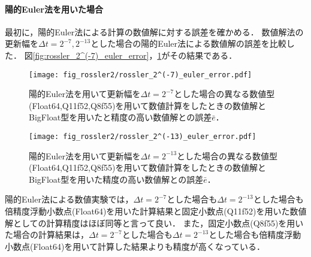 \paragraph*{陽的Euler法を用いた場合}
最初に，陽的Euler法による計算の数値解に対する誤差を確かめる．
数値解法の更新幅を$\Delta t = 2^{-7},2^{-13}$とした場合の陽的Euler法による数値解の誤差を比較した．
図\ref{fig:rossler_2^(-7)_euler_error}，\ref{fig:rossler_2^(-13)_euler_error}がその結果である．
\begin{figure}[H]
    \centering
    \begin{minipage}[b]{0.48\columnwidth}
        \centering
        \texttt{[image: fig\_rossler2/rossler\_2^(-7)\_euler\_error.pdf]}
        \caption{陽的Euler法を用いて更新幅を$\Delta t = 2^{-7}$とした場合の異なる数値型(Float64,Q11f52,Q8f55)を用いて数値計算をしたときの数値解とBigFloat型を用いたと精度の高い数値解との誤差$\bar{e}$．}
        \label{fig:rossler_2^(-7)_euler_error}
    \end{minipage}
    \hspace{0.01\columnwidth}
    \begin{minipage}[b]{0.48\columnwidth}
        \centering
        \texttt{[image: fig\_rossler2/rossler\_2^(-13)\_euler\_error.pdf]}
        \caption{陽的Euler法を用いて更新幅を$\Delta t =  2^{-13}$とした場合の異なる数値型(Float64,Q11f52,Q8f55)を用いて数値計算をしたときの数値解とBigFloat型を用いた精度の高い数値解との誤差$\bar{e}$．}
        \label{fig:rossler_2^(-13)_euler_error}
    \end{minipage}
\end{figure} 
陽的Euler法による数値実験では，$\Delta t = 2^{-7}$とした場合も$\Delta t =  2^{-13}$とした場合も倍精度浮動小数点(Float64)を用いた計算結果と固定小数点(Q11f52)を用いた数値解としての計算精度はほぼ同等と言って良い．
また，固定小数点(Q8f55)を用いた場合の計算結果は，$\Delta t = 2^{-7}$とした場合も$\Delta t =  2^{-13}$とした場合も倍精度浮動小数点(Float64)を用いて計算した結果よりも精度が高くなっている．


